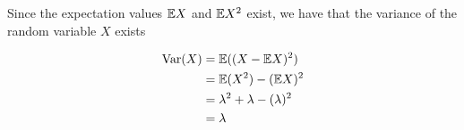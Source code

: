 
Since the expectation values $ \mathbb{E} X$ and $ \mathbb{E} X^2$ exist, we have that the variance of the random
variable $ X$ exists 

\begin{align*}
    \mathrm{Var} (X) &= \mathbb{E} ((X - \mathbb{E} X)^2)\\
	     &= \mathbb{E}(X^2) - (\mathbb{E} X)^2\\
	     &= \lambda^2 + \lambda - (\lambda)^2\\
	     &= \lambda
\end{align*}
